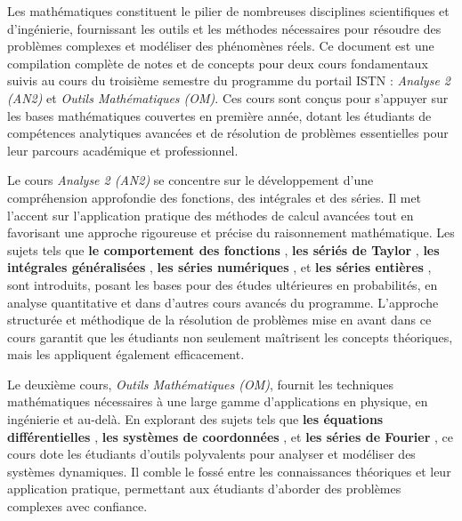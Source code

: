 \label{ch:Introduction}

Les mathématiques constituent le pilier de nombreuses disciplines scientifiques et d’ingénierie, fournissant les outils et les méthodes nécessaires pour résoudre des problèmes complexes et modéliser des phénomènes réels. Ce document est une compilation complète de notes et de concepts pour deux cours fondamentaux suivis au cours du troisième semestre du programme du portail ISTN : \emph{Analyse 2 (AN2)} et \emph{Outils Mathématiques (OM)}. Ces cours sont conçus pour s’appuyer sur les bases mathématiques couvertes en première année, dotant les étudiants de compétences analytiques avancées et de résolution de problèmes essentielles pour leur parcours académique et professionnel.

Le cours \emph{Analyse 2 (AN2)} se concentre sur le développement d’une compréhension approfondie des fonctions, des intégrales et des séries. Il met l’accent sur l’application pratique des méthodes de calcul avancées tout en favorisant une approche rigoureuse et précise du raisonnement mathématique. Les sujets tels que \textbf{le comportement des fonctions }, \textbf{les sériés de Taylor }, \textbf{les intégrales généralisées }, \textbf{les séries numériques }, et \textbf{les séries entières }, sont introduits, posant les bases pour des études ultérieures en probabilités, en analyse quantitative et dans d’autres cours avancés du programme. L’approche structurée et méthodique de la résolution de problèmes mise en avant dans ce cours garantit que les étudiants non seulement maîtrisent les concepts théoriques, mais les appliquent également efficacement.

Le deuxième cours, \emph{Outils Mathématiques (OM)}, fournit les techniques mathématiques nécessaires à une large gamme d’applications en physique, en ingénierie et au-delà. En explorant des sujets tels que \textbf{les équations différentielles }, \textbf{les systèmes de coordonnées }, et \textbf{les séries de Fourier }, ce cours dote les étudiants d’outils polyvalents pour analyser et modéliser des systèmes dynamiques. Il comble le fossé entre les connaissances théoriques et leur application pratique, permettant aux étudiants d’aborder des problèmes complexes avec confiance.
